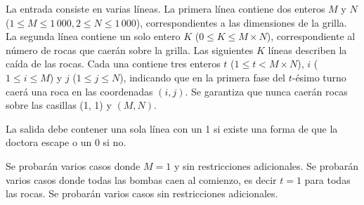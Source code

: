\documentclass{oci}
\begin{document}
\begin{inputDescription}
  La entrada consiste en varias líneas.
  La primera línea contiene dos enteros $M$ y $N$ ($1 \le M \le 1\,000, 2 \le N \le 1\,000$), correspondientes a las
  dimensiones de la grilla.
  La segunda línea contiene un solo entero $K$ ($0 \le K \le M\times N$), correspondiente al número de
  rocas que caerán sobre la grilla.
  Las siguientes $K$ líneas describen la caída de las rocas.
  Cada una contiene tres enteros $t$ ($1 \le t < M\times N$), $i$ ($1 \le i \le M$) y $j$ ($1 \le
  j \le N$), indicando que en la primera fase del $t$-ésimo turno caerá una roca en las coordenadas $(i,
  j)$.
  Se garantiza que nunca caerán rocas sobre las casillas (1, 1) y $(M, N)$.
\end{inputDescription}

\begin{outputDescription}
  La salida debe contener una sola línea con un 1 si existe una forma de que la doctora escape o un 0
  si no.
\end{outputDescription}

\begin{scoreDescription}
  Se probarán varios casos donde $M = 1$ y sin restricciones adicionales.
  Se probarán varios casos donde todas las bombas caen al comienzo, es decir $t = 1$ para todas las rocas.
  Se probarán varios casos sin restricciones adicionales.
\end{scoreDescription}

\begin{sampleDescription}
\end{sampleDescription}
\end{document}
